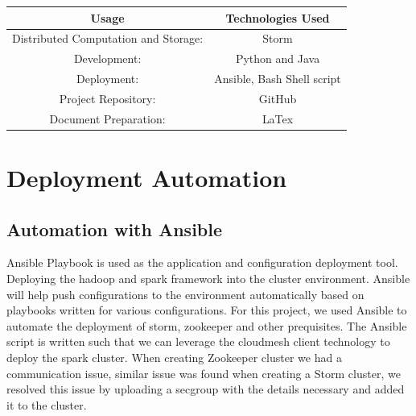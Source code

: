 \documentclass[9pt,twocolumn,twoside]{../../styles/osajnl}
\begin{document}
\begin{center}
 \begin{tabular}{||c c||} 
 \hline
 Usage & Technologies Used\\ [0.5ex]
 \hline\hline
 Distributed Computation and Storage:& Storm \\ 
 \hline
 Development: &Python and Java\\
 \hline
 Deployment: &Ansible, Bash Shell script\\
 \hline
 Project Repository: &GitHub \\
 \hline
 Document Preparation: &LaTex\\ [1ex] 
 \hline
\end{tabular}
\end{center}








  
\section{Deployment Automation}
\subsection{Automation with Ansible}
Ansible Playbook is used as the application and configuration
deployment tool. Deploying the hadoop and spark framework into the
cluster environment. Ansible will help push configurations to the
environment automatically based on playbooks written for various
configurations. For this project, we used Ansible to automate the
deployment of storm, zookeeper and other prequisites. The Ansible
script is written such that we can leverage the cloudmesh client
technology to deploy the spark cluster. When creating Zookeeper
cluster we had a communication issue, similar issue was found when
creating a Storm cluster, we resolved this issue by uploading a
secgroup with the details necessary and added it to the cluster.
\end{document}
